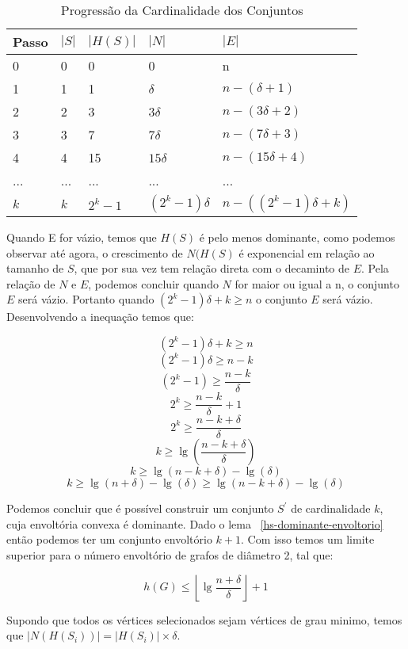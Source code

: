 \begin{table}[h]
\centering
\begin{tabular}{l|l|l|l|l}
Passo & $|S|$  & $|H(S)|$ & $|N|$ & $|E|$  \\ \hline
  0 & 0    & 0     & 0             & n                    \\
  1 & 1    & 1     & $\delta$      & $n - (\delta + 1)  $ \\
  2 & 2    & 3     & $3\delta$     & $n - (3\delta + 2) $ \\
  3 & 3    & 7     & $7\delta$     & $n - (7\delta + 3) $ \\
  4 & 4    & 15    & $15\delta$    & $n - (15\delta + 4)$ \\
... & ...& ...      & ...           & ...                  \\
  $k$ & $k$    & $2^k-1$& $(2^k-1)\delta$ & $n - ((2^k-1)\delta + k)$ \\
\end{tabular}
\caption{Progressão da Cardinalidade dos Conjuntos}
\label{tab:crescimento-envoltoria-dominante}
\end{table}

Quando E for vázio, temos que $H(S)$ é pelo menos dominante, como podemos observar até agora, o crescimento de $N(H(S)$ é exponencial em relação ao tamanho de $S$, que por sua vez tem relação direta com o decaminto de $E$. 
Pela relação de $N$ e $E$, podemos concluir quando $N$ for maior ou igual a n, o conjunto $E$ será vázio. Portanto quando $(2^k-1)\delta + k \ge n$ o conjunto $E$ será vázio. Desenvolvendo a inequação temos que:

$$ (2^k-1)\delta + k \ge n $$
$$ (2^k-1)\delta \ge n -k $$
$$ (2^k-1) \ge \frac{n-k}{\delta} $$
$$ 2^k \ge \frac{n-k}{\delta} +1 $$
$$ 2^k \ge \frac{n-k+\delta}{\delta} $$
$$ k \ge \lg{(\frac{n-k+\delta}{\delta})} $$
$$ k \ge \lg{(n-k+\delta)} - \lg{(\delta)} $$
$$ k \ge \lg{(n+\delta)} - \lg{(\delta)}  \ge \lg{(n-k+\delta)} - \lg{(\delta)} $$

Podemos concluir que é possível construir um conjunto $S^\prime$ de cardinalidade $k$, cuja envoltória convexa é dominante. Dado o lema ~\ref{hs-dominante-envoltorio} então podemos ter um conjunto envoltório $k+1$. Com isso temos um limite superior para o número envoltório de grafos de diâmetro 2, tal que:

$$ h(G) \le \left\lfloor \lg{ \frac{n+\delta}{\delta} } \right\rfloor + 1  $$




Supondo que todos os vértices selecionados sejam vértices de grau minimo, temos que $|N(H(S_i))|=|H(S_i)|\times\delta$.

